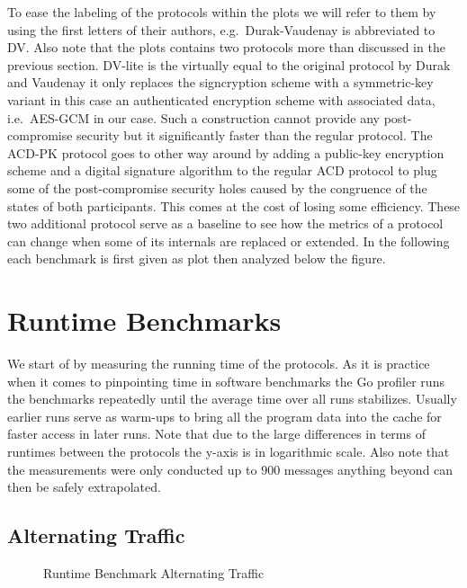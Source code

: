 \documentclass[11pt,a4paper,twoside,openright,bibliography=totoc]{scrbook}
\begin{document}
To ease the labeling of the protocols within the plots we will
refer to them by using the first letters of their authors,
e.g.~Durak-Vaudenay is abbreviated to DV. Also note that
the plots contains two protocols more than discussed in
the previous section. DV-lite is the virtually equal to
the original protocol by Durak and Vaudenay it only replaces
the signcryption scheme with a symmetric-key variant in
this case an authenticated encryption scheme with associated
data, i.e.~AES-GCM in our case. Such a construction cannot provide
any post-compromise security but it significantly faster
than the regular protocol. The ACD-PK protocol goes to other way around
by adding a public-key encryption scheme and a digital signature
algorithm to the regular ACD protocol to plug some
of the post-compromise security holes caused by
the congruence of the states of both participants.
This comes at the cost of losing some efficiency.
These two additional protocol serve as a baseline
to see how the metrics of a protocol can change when
some of its internals are replaced or extended. In the
following each benchmark is first given as plot then
analyzed below the figure.

\section{Runtime Benchmarks}
\label{sec:runtime-benchmarks}

We start of by measuring the running time of the protocols. As
it is practice when it comes to pinpointing time in software
benchmarks the Go profiler runs the benchmarks repeatedly
until the average time over all runs stabilizes. Usually
earlier runs serve as warm-ups to bring all the program
data into the cache for faster access in later runs.
Note that due to the large differences in terms
of runtimes between the protocols the y-axis is
in logarithmic scale. Also note that the measurements
were only conducted up to 900 messages anything beyond
can then be safely extrapolated.

\subsection{Alternating Traffic}
\label{sec:alternating-traffic}

\begin{figure}[H]
  \centering
   
  \caption{Runtime Benchmark Alternating Traffic}
  \label{fig:time-alt}
\end{figure}
\end{document}
